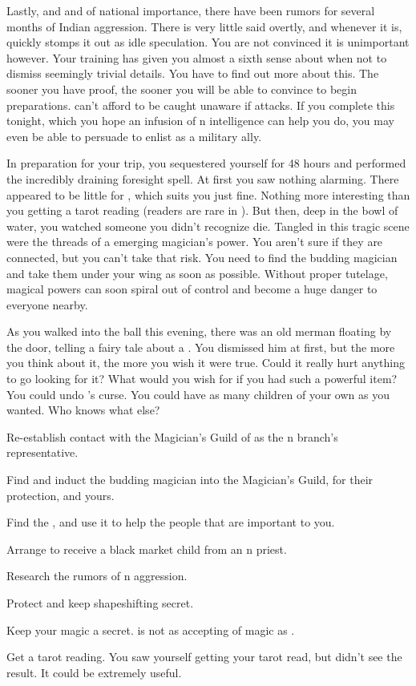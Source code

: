 \documentclass[char]{NeptuneBall}
\begin{document}
Lastly, and and of national importance, there have been rumors for several months of Indian aggression. There is very little said overtly, and whenever it is, \cPrince{} quickly stomps it out as idle speculation. You are not convinced it is unimportant however. Your training has given you almost a sixth sense about when not to dismiss seemingly trivial details.  You have to find out more about this. The sooner you have proof, the sooner you will be able to convince \cPrince{} to begin preparations. \pPacifica{} can't afford to be caught unaware if \pIndia{} attacks.  If you complete this tonight, which you hope an infusion of \pAtlantis{}n intelligence can help you do, you may even be able to persuade \cPrince{} to enlist \pAtlantis{} as a military ally.

In preparation for your trip, you sequestered yourself for 48 hours and performed the incredibly draining foresight spell. At first you saw nothing alarming. There appeared to be little for \cPrince{}, which suits you just fine. Nothing more interesting than you getting a tarot reading (readers are rare in \pPacifica{}). But then, deep in the bowl of water, you watched someone you didn't recognize die. Tangled in this tragic scene were the threads of a emerging magician's power. You aren't sure if they are connected, but you can't take that risk. You need to find the budding magician and take them under your wing as soon as possible. Without proper tutelage, magical powers can soon spiral out of control and become a huge danger to everyone nearby.

As you walked into the ball this evening, there was an old merman floating by the door, telling a fairy tale about a \iWishingStone{\MYname}. You dismissed him at first, but the more you think about it, the more you wish it were true. Could it really hurt anything to go looking for it? What would you wish for if you had such a powerful item? You could undo \cPrince{}'s curse. You could have as many children of your own as you wanted. Who knows what else?

\begin{itemz}[Goals]
  \item Re-establish contact with the Magician's Guild of \pAtlantis{} as the \pPacifica{}n branch's representative.
  \item Find and induct the budding magician into the Magician's Guild, for their protection, and yours.
	\item Find the \iWishingStone{}, and use it to help the people that are important to you.
  \item Arrange to receive a black market child from an \pAtlantis{}n priest.
  \item Research the rumors of \pIndia{}n aggression.
  \item Protect \cPrince{} and keep \cPrince{\their} shapeshifting secret.
	\item Keep your magic a secret. \pAtlantis{} is not as accepting of magic as \pPacifica{}.
	\item Get a tarot reading. You saw yourself getting your tarot read, but didn't see the result. It could be extremely useful.
\end{itemz}
\end{document}
